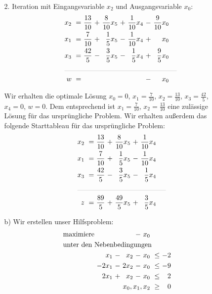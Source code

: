 \documentclass [a4paper,11pt]{article}
\begin{document}
\begin{enumerate}
\begin{enumerate}
            2. Iteration mit Eingangsvariable $x_2$ und Ausgangsvariable $x_0$:
            \begin{align*}
            \begin{alignedat}{6}
            && x_2 &\ = &\  \frac{13}{10} &\ + &\ \frac{8}{10}x_5 &\ + &\ \frac{1}{10}x_4 &\ - &\ \frac{9}{10}x_0 \\
            && x_1 &\ = &\  \frac{7}{10} &\ + &\  \frac{1}{5}x_5 &\ - &\ \frac{1}{10}x_4 &\ + &\             x_0 \\
            && x_3 &\ = &\  \frac{42}{5} &\ - &\  \frac{3}{5}x_5 &\ - &\ \frac{1}{5}x_4 &\ + &\  \frac{9}{5}x_0 \\
            &\rlap{\rule{5.7cm}{.1pt}} &&&&&&&&&\\
            && w   &\ = & & & & & &\ - &\ x_0
            \end{alignedat}
            \end{align*}

            \newpage

            Wir erhalten die optimale Lösung $x_0 = 0$, $x_1 = \frac{7}{10}$, $x_2 = \frac{13}{10}$, $x_3 = \frac{42}{5}$, $x_4 = 0$, $w = 0$.
            Dem entsprechend ist $x_1 = \frac{7}{10}$, $x_2 = \frac{13}{10}$
            eine zulässige Lösung für das ursprüngliche Problem. Wir erhalten außerdem das folgende Starttableau für das ursprüngliche Problem:
            \begin{align*}
            \begin{alignedat}{6}
            && x_2 &\ = &\ \frac{13}{10} &\ + &\ \frac{8}{10}x_5 &\ + &\ \frac{1}{10}x_4 \\
            && x_1 &\ = &\ \frac{7}{10} &\ + &\  \frac{1}{5}x_5 &\ - &\ \frac{1}{10}x_4 \\
            && x_3 &\ = &\ \frac{42}{5} &\ - &\  \frac{3}{5}x_5 &\ - &\ \frac{1}{5}x_4 \\
            &\rlap{\rule{4.5cm}{.1pt}} &&&&&&&\\
            && z   &\ = &\ \frac{89}{5} &\ + &\ \frac{49}{5}x_5 &\ + &\  \frac{3}{5}x_4
            \end{alignedat}
            \end{align*}

            \item[b)]
            Wir erstellen unser Hilfsproblem:
            \begin{align*}
            \begin{alignedat}{5}
            & \text{maximiere } & & & &\ - &\ x_0 & & \\
            & \rlap{unter den Nebenbedingungen} & & & & & & & \\
            &&   x_1 &\ - &\  x_2 &\ - &\ x_0 &\ \leq &\ -2 \\
            && -2x_1 &\ - &\ 2x_2 &\ - &\ x_0 &\ \leq &\ -9 \\
            &&  2x_1 &\ + &\  x_2 &\ - &\ x_0 &\ \leq &\  2 \\
            && & & & & \llap{$x_0, x_1, x_2$} &\ \geq &\ 0 
            \end{alignedat}
            \end{align*}


\end{enumerate}
\end{enumerate}
\end{document}
